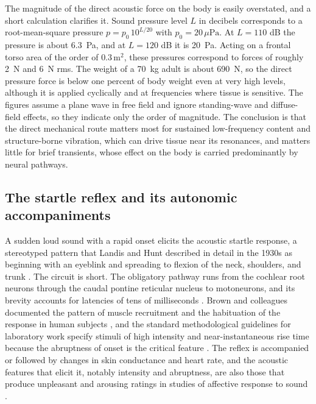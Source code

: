 \documentclass[11pt]{article}
\theoremstyle{plain}
\theoremstyle{definition}
\begin{document}
The magnitude of the direct acoustic force on the body is easily overstated, and a short calculation clarifies it. Sound pressure level $L$ in decibels corresponds to a root-mean-square pressure $p = p_0\,10^{L/20}$ with $p_0 = 20\,\mu\mathrm{Pa}$. At $L=110$ dB the pressure is about 6.3~Pa, and at $L=120$ dB it is 20~Pa. Acting on a frontal torso area of the order of $0.3\,\mathrm{m}^2$, these pressures correspond to forces of roughly 2~N and 6~N rms. The weight of a 70~kg adult is about 690~N, so the direct pressure force is below one percent of body weight even at very high levels, although it is applied cyclically and at frequencies where tissue is sensitive. The figures assume a plane wave in free field and ignore standing-wave and diffuse-field effects, so they indicate only the order of magnitude. The conclusion is that the direct mechanical route matters most for sustained low-frequency content and structure-borne vibration, which can drive tissue near its resonances, and matters little for brief transients, whose effect on the body is carried predominantly by neural pathways.

\subsection{The startle reflex and its autonomic accompaniments}

A sudden loud sound with a rapid onset elicits the acoustic startle response, a stereotyped pattern that Landis and Hunt described in detail in the 1930s as beginning with an eyeblink and spreading to flexion of the neck, shoulders, and trunk \citep{landis1939}. The circuit is short. The obligatory pathway runs from the cochlear root neurons through the caudal pontine reticular nucleus to motoneurons, and its brevity accounts for latencies of tens of milliseconds \citep{davis1984,koch1999}. Brown and colleagues documented the pattern of muscle recruitment and the habituation of the response in human subjects \citep{brown1991}, and the standard methodological guidelines for laboratory work specify stimuli of high intensity and near-instantaneous rise time because the abruptness of onset is the critical feature \citep{blumenthal2005}. The reflex is accompanied or followed by changes in skin conductance and heart rate, and the acoustic features that elicit it, notably intensity and abruptness, are also those that produce unpleasant and arousing ratings in studies of affective response to sound \citep{bradley2000}.
\end{document}
